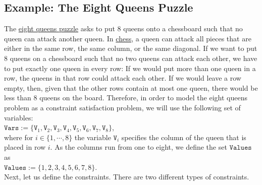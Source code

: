 \subsection{Example: The Eight Queens Puzzle}
The \href{https://en.wikipedia.org/wiki/Eight_queens_puzzle}{eight queens puzzle} asks to put 8 queens onto a
chessboard such that no queen can attack another queen.  In \href{https://en.wikipedia.org/wiki/Chess}{chess},
a queen can attack all pieces that are either in the same row, the same column, or the same diagonal.  If we
want to put 8 queens on a chessboard such that no two queens can attack each other, we have to put exactly one
queen in every row:  If we would put more than one queen in a row, the queens in that row could attack each
other.  If we would leave a row empty, then, given that the other rows contain at most one queen, there would
be less than 8 queens on the board.  Therefore, in order to model the eight queens problem as a constraint
satisfaction problem, we will use the following set of variables:  
\\[0.2cm]
\hspace*{1.3cm}
$\texttt{Vars} := \{ \texttt{V}_1, \texttt{V}_2, \texttt{V}_3, \texttt{V}_4, \texttt{V}_5, \texttt{V}_6, \texttt{V}_7,\texttt{V}_8 \}$,
\\[0.2cm]
where for $i \in \{1,\cdots,8\}$ the variable $\texttt{V}_i$ specifies the column of the queen that is placed in
row $i$.   As the columns run from one to eight, we define the set $\texttt{Values}$ as
\\[0.2cm]
\hspace*{1.3cm}
$\texttt{Values} := \{1,2,3,4,5,6,7,8\}$.
\\[0.2cm]
Next, let us define the constraints.  There are two different types of constraints.
